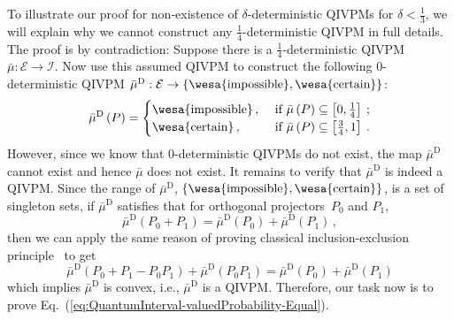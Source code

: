 \documentclass[english,reprint, aps, prl,superscriptaddress, showpacs,
showkeys, longbibliography, amsmath, amssymb, floatfix]{revtex4-1}
\theoremstyle{plain}
\theoremstyle{definition}
\newcommand{\events}{\ensuremath{\mathcal{E}}}
\newcommand{\imposs}{{\text{\wesa{impossible}}}}
\newcommand{\necess}{{\text{\wesa{certain}}}}
\begin{document}
To illustrate our proof for non-existence of $\delta$-deterministic
QIVPMs for $\delta<\frac{1}{3}$, we will explain why we cannot construct
any $\frac{1}{4}$-deterministic QIVPM in full details. The proof
is by contradiction: Suppose there is a $\frac{1}{4}$-deterministic
QIVPM~$\bar{\mu}:\events\rightarrow\mathscr{I}$. Now use this assumed
QIVPM to construct the following $0$-deterministic QIVPM $\bar{\mu}^{\textrm{D}}:\events\rightarrow\left\{ \imposs,\necess\right\} $:
\begin{equation}
\bar{\mu}^{\textrm{D}}\left(P\right)=\begin{cases}
\imposs\,, & \textrm{ if }\bar{\mu}\left(P\right)\subseteq\left[0,\tfrac{1}{4}\right]\:;\\
\necess\,, & \textrm{ if }\bar{\mu}\left(P\right)\subseteq\left[\tfrac{3}{4},1\right]\:.
\end{cases}
\end{equation}
However, since we know that $0$-deterministic QIVPMs do not exist,
the map $\bar{\mu}^{\textrm{D}}$ cannot exist and hence $\bar{\mu}$
does not exist. It remains to verify that $\bar{\mu}^{\textrm{D}}$
is indeed a QIVPM. Since the range of $\bar{\mu}^{\textrm{D}}$, $\left\{ \imposs,\necess\right\} $,
is a set of singleton sets, if $\bar{\mu}^{\textrm{D}}$ satisfies
that for orthogonal projectors~$P_{0}$ and $P_{1}$, 
\begin{equation}
\bar{\mu}^{\textrm{D}}\left(P_{0}+P_{1}\right)=\bar{\mu}^{\textrm{D}}\left(P_{0}\right)+\bar{\mu}^{\textrm{D}}\left(P_{1}\right)\,,\label{eq:QuantumInterval-valuedProbability-Equal}
\end{equation}
then we can apply the same reason of proving classical inclusion-exclusion
principle~\cite{TaiThesis2018} to get
\[
\bar{\mu}^{\textrm{D}}\left(P_{0}+P_{1}-P_{0}P_{1}\right)+\bar{\mu}^{\textrm{D}}\left(P_{0}P_{1}\right)=\bar{\mu}^{\textrm{D}}\left(P_{0}\right)+\bar{\mu}^{\textrm{D}}\left(P_{1}\right)
\]
which implies $\bar{\mu}^{\textrm{D}}$ is convex, i.e., $\bar{\mu}^{\textrm{D}}$
is a QIVPM. Therefore, our task now is to prove Eq.~(\ref{eq:QuantumInterval-valuedProbability-Equal}).
\end{document}
